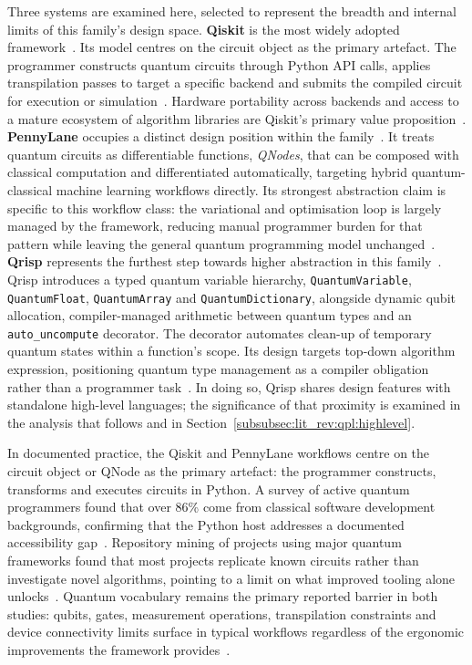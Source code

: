 Three systems are examined here, selected to represent the breadth and internal limits of this family's design space.
\textbf{Qiskit} is the most widely adopted framework~\cite{murillo2022sequantumprogramming}.
Its model centres on the circuit object as the primary artefact.
The programmer constructs quantum circuits through Python API calls, applies transpilation passes to target a specific backend and submits the compiled circuit for execution or simulation~\cite{aleksandrowicz2019qiskit}.
Hardware portability across backends and access to a mature ecosystem of algorithm libraries are Qiskit's primary value proposition~\cite{aleksandrowicz2019qiskit}.
\textbf{PennyLane} occupies a distinct design position within the family~\cite{bergholm2018pennylane}.
It treats quantum circuits as differentiable functions, \textit{QNodes}, that can be composed with classical computation and differentiated automatically, targeting hybrid quantum-classical machine learning workflows directly.
Its strongest abstraction claim is specific to this workflow class: the variational and optimisation loop is largely managed by the framework, reducing manual programmer burden for that pattern while leaving the general quantum programming model unchanged~\cite{bergholm2018pennylane}.
\textbf{Qrisp} represents the furthest step towards higher abstraction in this family~\cite{seidel2024qrisp}.
Qrisp introduces a typed quantum variable hierarchy, \texttt{QuantumVariable}, \texttt{QuantumFloat}, \texttt{QuantumArray} and \texttt{QuantumDictionary}, alongside dynamic qubit allocation, compiler-managed arithmetic between quantum types and an \texttt{auto\_uncompute} decorator.
The decorator automates clean-up of temporary quantum states within a function's scope.
Its design targets top-down algorithm expression, positioning quantum type management as a compiler obligation rather than a programmer task~\cite{seidel2024qrisp}.
In doing so, Qrisp shares design features with standalone high-level languages; the significance of that proximity is examined in the analysis that follows and in Section~\ref{subsubsec:lit_rev:qpl:highlevel}.

In documented practice, the Qiskit and PennyLane workflows centre on the circuit object or QNode as the primary artefact: the programmer constructs, transforms and executes circuits in Python.
A survey of active quantum programmers found that over 86\% come from classical software development backgrounds, confirming that the Python host addresses a documented accessibility gap~\cite{ferreira2024qplusage}.
Repository mining of projects using major quantum frameworks found that most projects replicate known circuits rather than investigate novel algorithms, pointing to a limit on what improved tooling alone unlocks~\cite{murillo2022sequantumprogramming}.
Quantum vocabulary remains the primary reported barrier in both studies: qubits, gates, measurement operations, transpilation constraints and device connectivity limits surface in typical workflows regardless of the ergonomic improvements the framework provides~\cite{ferreira2024qplusage, murillo2022sequantumprogramming}.


